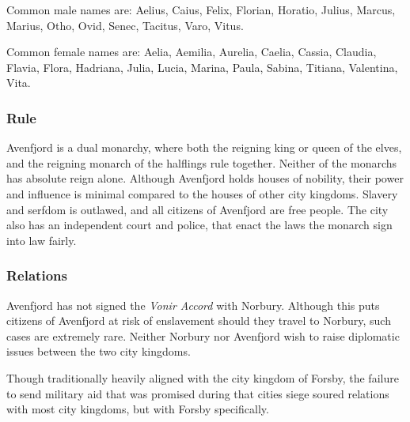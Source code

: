 Common male names are: Aelius, Caius, Felix, Florian, Horatio, Julius, Marcus,
Marius, Otho, Ovid, Senec, Tacitus, Varo, Vitus.

Common female names are: Aelia, Aemilia, Aurelia, Caelia, Cassia, Claudia,
Flavia, Flora, Hadriana, Julia, Lucia, Marina, Paula, Sabina, Titiana,
Valentina, Vita.

\subsubsection{Rule}

Avenfjord is a dual monarchy, where both the reigning king or queen of the
elves, and the reigning monarch of the halflings rule together. Neither of
the monarchs has absolute reign alone. Although Avenfjord holds houses of
nobility, their power and influence is minimal compared to the houses of
other city kingdoms. Slavery and serfdom is outlawed, and all citizens of
Avenfjord are free people. The city also has an independent court and police,
that enact the laws the monarch sign into law fairly.

\subsubsection{Relations}

Avenfjord has not signed the \emph{Vonir Accord} with Norbury. Although this
puts citizens of Avenfjord at risk of enslavement should they travel to
Norbury, such cases are extremely rare. Neither Norbury nor Avenfjord wish
to raise diplomatic issues between the two city kingdoms.

Though traditionally heavily aligned with the city kingdom of Forsby, the
failure to send military aid that was promised during that cities siege
soured relations with most city kingdoms, but with Forsby specifically.
